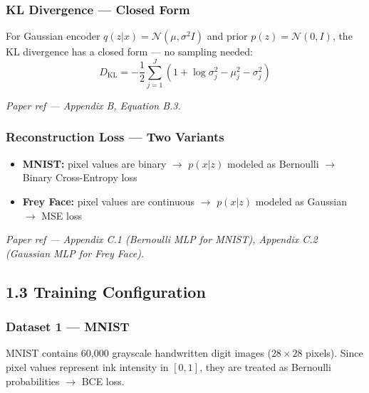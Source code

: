 \documentclass{article}
\newcommand{\paperref}[1]{{\color{paperrefcolor}\emph{#1}}}
\begin{document}
\subsubsection*{KL Divergence --- Closed Form}

For Gaussian encoder $q(z|x) = \mathcal{N}(\mu, \sigma^2 I)$ and prior $p(z) = \mathcal{N}(0, I)$, the KL divergence has a closed form --- no sampling needed:
\[
D_{\mathrm{KL}} = -\frac{1}{2}\sum_{j=1}^{J}\left(1 + \log\sigma_j^2 - \mu_j^2 - \sigma_j^2\right)
\]

\paperref{Paper ref --- Appendix B, Equation B.3.}

\subsubsection*{Reconstruction Loss --- Two Variants}

\begin{itemize}
    \item \textbf{MNIST:} pixel values are binary $\to$ $p(x|z)$ modeled as Bernoulli $\to$ Binary Cross-Entropy loss
    \item \textbf{Frey Face:} pixel values are continuous $\to$ $p(x|z)$ modeled as Gaussian $\to$ MSE loss
\end{itemize}

\paperref{Paper ref --- Appendix C.1 (Bernoulli MLP for MNIST), Appendix C.2 (Gaussian MLP for Frey Face).}

\subsection{1.3 \; Training Configuration}

\subsubsection*{Dataset 1 --- MNIST}

MNIST contains 60,000 grayscale handwritten digit images ($28 \times 28$ pixels). Since pixel values represent ink intensity in $[0,1]$, they are treated as Bernoulli probabilities $\to$ BCE loss.
\end{document}
